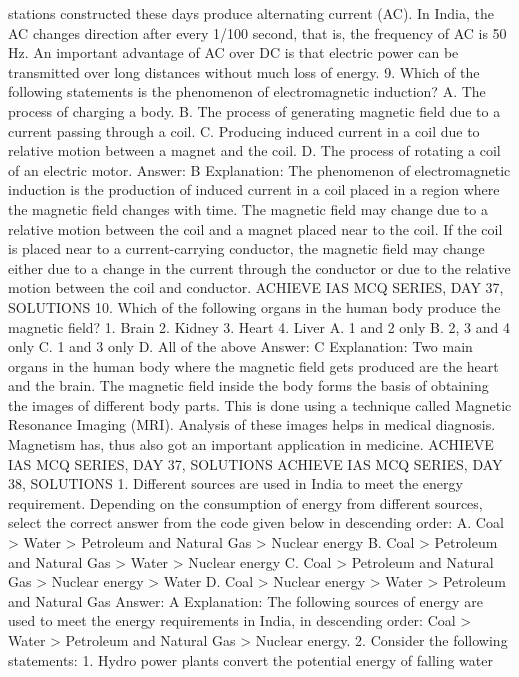 stations constructed these days produce alternating current (AC).
In India, the AC changes direction after every 1/100 second, that is,
the frequency of AC is 50 Hz. An important advantage of AC over
DC is that electric power can be transmitted over long distances
without much loss of energy.
9. Which of the following statements is the phenomenon of
electromagnetic induction?
A. The process of charging a body.
B. The process of generating magnetic field due to a current passing
through a coil.
C. Producing induced current in a coil due to relative motion between
a magnet and the coil.
D. The process of rotating a coil of an electric motor.
Answer: B
Explanation: The phenomenon of electromagnetic induction is the
production of induced current in a coil placed in a region where the
magnetic field changes with time. The magnetic field may change due
to a relative motion between the coil and a magnet placed near to
the coil. If the coil is placed near to a current-carrying conductor,
the magnetic field may change either due to a change in the current
through the conductor or due to the relative motion between the
coil and conductor.
ACHIEVE IAS MCQ SERIES, DAY 37, SOLUTIONS
10. Which of the following organs in the human body produce
the magnetic field?
1. Brain
2. Kidney
3. Heart
4. Liver
A. 1 and 2 only
B. 2, 3 and 4 only
C. 1 and 3 only
D. All of the above
Answer: C
Explanation: Two main organs in the human body where the
magnetic field gets produced are the heart and the brain. The
magnetic field inside the body forms the basis of obtaining the
images of different body parts. This is done using a technique called
Magnetic Resonance Imaging (MRI). Analysis of these images helps
in medical diagnosis. Magnetism has, thus also got an important
application in medicine.
ACHIEVE IAS MCQ SERIES, DAY 37, SOLUTIONS
ACHIEVE IAS MCQ SERIES, DAY 38, SOLUTIONS
1. Different sources are used in India to meet the energy
requirement. Depending on the consumption of energy from
different sources, select the correct answer from the code given
below in descending order:
A. Coal > Water > Petroleum and Natural Gas > Nuclear energy
B. Coal > Petroleum and Natural Gas > Water > Nuclear energy
C. Coal > Petroleum and Natural Gas > Nuclear energy > Water
D. Coal > Nuclear energy > Water > Petroleum and Natural Gas
Answer: A
Explanation: The following sources of energy are used to meet the
energy requirements in India, in descending order:
Coal > Water > Petroleum and Natural Gas > Nuclear energy.
2. Consider the following statements:
1. Hydro power plants convert the potential energy of falling water
